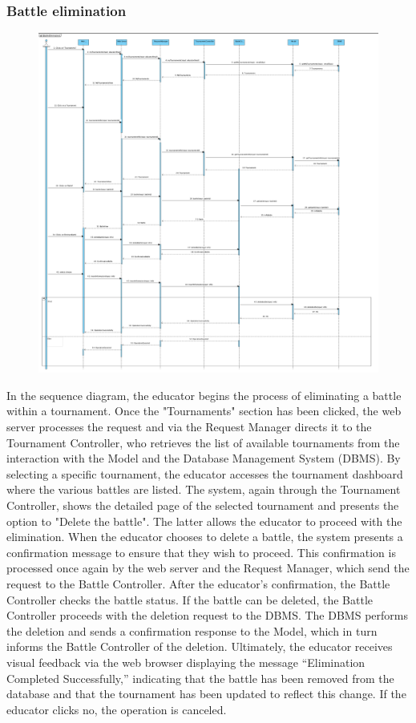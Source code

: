 \subsubsection{Battle elimination}
\begin{figure}[H]
    \centering
    \includegraphics[width=1\textwidth]{SequenceDiagram/BattleElimination.png}
    \label{fig:enter-label}
\end{figure}
In the sequence diagram, the educator begins the process of eliminating a battle within a tournament. Once the "Tournaments" section has been clicked, the web server processes the request and via the Request Manager directs it to the Tournament Controller, who retrieves the list of available tournaments from the interaction with the Model and the Database Management System (DBMS).
By selecting a specific tournament, the educator accesses the tournament dashboard where the various battles are listed. The system, again through the Tournament Controller, shows the detailed page of the selected tournament and presents the option to "Delete the battle". The latter allows the educator to proceed with the elimination.
When the educator chooses to delete a battle, the system presents a confirmation message to ensure that they wish to proceed. This confirmation is processed once again by the web server and the Request Manager, which send the request to the Battle Controller.
After the educator's confirmation, the Battle Controller checks the battle status. If the battle can be deleted, the Battle Controller proceeds with the deletion request to the DBMS. The DBMS performs the deletion and sends a confirmation response to the Model, which in turn informs the Battle Controller of the deletion.
Ultimately, the educator receives visual feedback via the web browser displaying the message “Elimination Completed Successfully,” indicating that the battle has been removed from the database and that the tournament has been updated to reflect this change.
If the educator clicks no, the operation is canceled.
